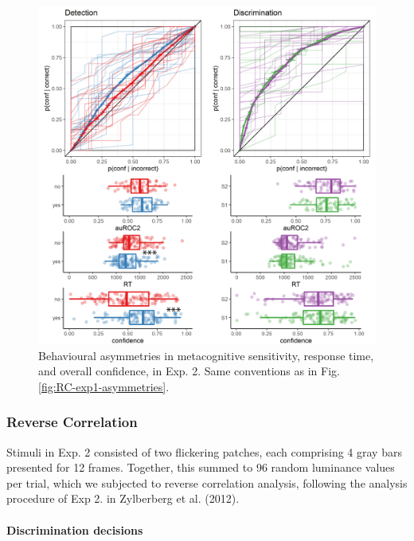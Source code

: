 \documentclass[12pt,twoside]{reedthesis}
\begin{document}
\begin{figure}
\includegraphics[width=\textwidth]{figure/RC/RC-exp2-asymmetries-enhanced} \caption[Behavioural asymmetries in metacognitive sensitivity, response time, and overall confidence, in Exp. 2]{Behavioural asymmetries in metacognitive sensitivity, response time, and overall confidence, in Exp. 2. Same conventions as in Fig. \ref{fig:RC-exp1-asymmetries}.}\label{fig:RC-exp2-asymmetries}
\end{figure}
\hypertarget{reverse-correlation-1}{%
\subsubsection{Reverse Correlation}\label{reverse-correlation-1}}

Stimuli in Exp. 2 consisted of two flickering patches, each comprising 4 gray bars presented for 12 frames. Together, this summed to 96 random luminance values per trial, which we subjected to reverse correlation analysis, following the analysis procedure of Exp 2. in Zylberberg et al. (2012).

\hypertarget{discrimination-decisions}{%
\paragraph{Discrimination decisions}\label{discrimination-decisions}}
\end{document}
